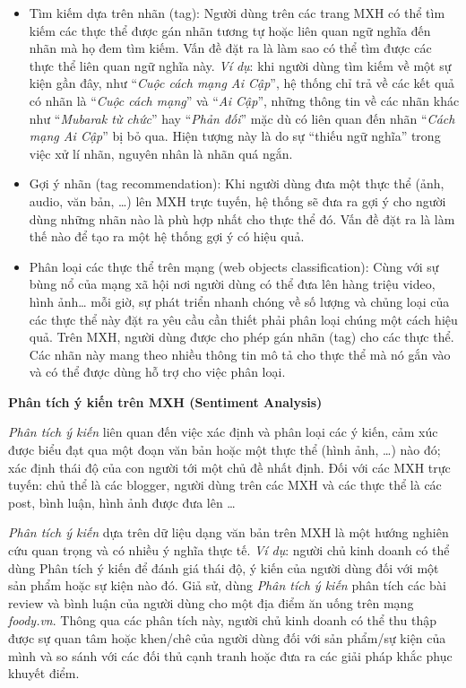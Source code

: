 \documentclass[12pt]{extarticle}
\begin{document}
			\begin{itemize}
				\item Tìm kiếm dựa trên nhãn (tag): Người dùng trên các trang MXH có thể tìm kiếm các thực thể được gán nhãn tương tự hoặc liên quan ngữ nghĩa đến nhãn mà họ đem tìm kiếm. Vấn đề đặt ra là làm sao có thể tìm được các thực thể liên quan ngữ nghĩa này. \textit{Ví dụ}: khi người dùng tìm kiếm về một sự kiện gần đây, như “\textit{Cuộc cách mạng Ai Cập}”, hệ thống chỉ trả về các kết quả có nhãn là “\textit{Cuộc cách mạng}” và “\textit{Ai Cập}”, những thông tin về các nhãn khác như “\textit{Mubarak từ chức}” hay “\textit{Phản đối}” mặc dù có liên quan đến nhãn “\textit{Cách mạng Ai Cập}” bị bỏ qua. Hiện tượng này là do sự “thiếu ngữ nghĩa” trong việc xử lí nhãn, nguyên nhân là nhãn quá ngắn.
				\item Gợi ý nhãn (tag recommendation): Khi người dùng đưa một thực thể (ảnh, audio, văn bản, …) lên MXH trực tuyến, hệ thống sẽ đưa ra gợi ý cho người dùng những nhãn nào là phù hợp nhất cho thực thể đó. Vấn đề đặt ra là làm thế nào để tạo ra một hệ thống gợi ý có hiệu quả.   
				\item Phân loại các thực thể trên mạng (web objects classification): Cùng với sự bùng nổ của mạng xã hội nơi người dùng có thể đưa lên hàng triệu video, hình ảnh… mỗi giờ, sự phát triển nhanh chóng về số lượng và chủng loại của các thực thể này đặt ra yêu cầu cần thiết phải phân loại chúng một cách hiệu quả. Trên MXH, người dùng được cho phép gán nhãn (tag) cho các thực thể. Các nhãn này mang theo nhiều thông tin mô tả cho thực thể mà nó gắn vào và có thể được dùng hỗ trợ cho việc phân loại.
			\end{itemize}
			\par \textbf{Phân tích ý kiến trên MXH (Sentiment Analysis)}
			\par \textit{Phân tích ý kiến} liên quan đến việc xác định và phân loại các ý kiến, cảm xúc được biểu đạt qua một đoạn văn bản hoặc một thực thể (hình ảnh, …) nào đó; xác định thái độ của con người tới một chủ đề nhất định. Đối với các MXH trực tuyến: chủ thể là các blogger, người dùng trên các MXH và các thực thể là các post, bình luận, hình ảnh được đưa lên …
			\par \textit{Phân tích ý kiến} dựa trên dữ liệu dạng văn bản trên MXH là một hướng nghiên cứu quan trọng và có nhiều ý nghĩa thực tế. \textit{Ví dụ}: người chủ kinh doanh có thể dùng Phân tích ý kiến để đánh giá thái độ, ý kiến của người dùng đối với một sản phẩm hoặc sự kiện nào đó. Giả sử, dùng \textit{Phân tích ý kiến} phân tích các bài review và bình luận của người dùng cho một địa điểm ăn uống trên mạng \textit{foody.vn}. Thông qua các phân tích này, người chủ kinh doanh có thể thu thập được sự quan tâm hoặc khen/chê của người dùng đối với sản phẩm/sự kiện của mình và so sánh với các đối thủ cạnh tranh hoặc đưa ra các giải pháp khắc phục khuyết điểm.
\end{document}
